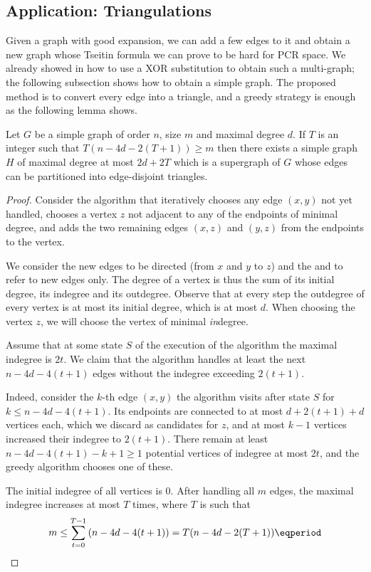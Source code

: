 \subsection{Application: Triangulations}
\label{sec:triangulations}

Given a graph with good expansion, we can add a few edges to it and obtain a new graph whose Tseitin formula we can prove to be hard for PCR space. We already showed in  how to use a XOR substitution to obtain such a multi-graph; the following subsection shows how to obtain a simple graph. The proposed method is to convert every edge into a triangle, and a greedy strategy is enough as the following lemma shows.

\begin{lemma}
\label{lem:triangulation}
  Let $G$ be a simple graph of order $n$, size $m$ and maximal degree $d$. If $T$ is an integer such that $T(n-4d-2(T+1))\geq m$ then there exists a simple graph $H$ of maximal degree at most $2d+2T$ which is a supergraph of $G$ whose edges can be partitioned into edge-disjoint triangles.
\end{lemma}

\begin{proof}
  Consider the algorithm that iteratively chooses any edge $(x,y)$ not yet handled, chooses a vertex $z$ not adjacent to any of the endpoints of minimal degree, and adds the two remaining edges $(x,z)$ and $(y,z)$ from the endpoints to the vertex.

We consider the new edges to be directed (from $x$ and $y$ to $z$) and the  and  to refer to new edges only. The degree of a vertex is thus the sum of its initial degree, its indegree and its outdegree. Observe that at every step the outdegree of every vertex is at most its initial degree, which is at most $d$. When choosing the vertex $z$, we will choose the vertex of minimal \emph{in}degree.

Assume that at some state $S$ of the execution of the algorithm the maximal indegree is $2t$. We claim that the algorithm handles at least the next $n-4d-4(t+1)$ edges without the indegree exceeding $2(t+1)$.

Indeed, consider the $k$-th edge $(x,y)$ the algorithm visits after state $S$ for $k \leq n-4d-4(t+1)$. Its endpoints are connected to at most $d+2(t+1)+d$ vertices each, which we discard as candidates for $z$, %
and at most $k-1$ vertices increased their indegree to $2(t+1)$.
%
There remain at least $n-4d-4(t+1)-k+1\geq 1$ potential vertices of indegree at most $2t$, and the greedy algorithm chooses one of these.

%
The initial indegree of all vertices is $0$. After handling all $m$ edges, the maximal indegree increases at most $T$ times, where $T$ is such that
\begin{equation}
  \label{eq:triangulation-bound}
  m\leq \sum_{t=0}^{T-1}\left(n-4d-4(t+1)\right) = T(n-4d-2(T+1)) \eqperiod \qedhere
\end{equation}
\end{proof}


